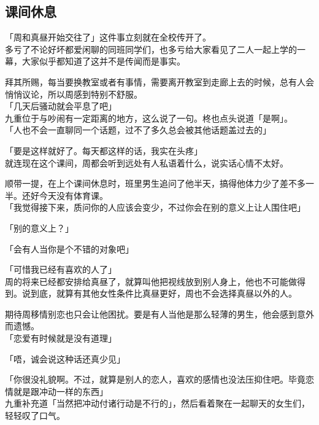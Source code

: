 \subsection{课间休息}

「周和真昼开始交往了」这件事立刻就在全校传开了。\\

多亏了不论好坏都爱闲聊的同班同学们，也多亏给大家看见了二人一起上学的一幕，大家似乎都知道了这并不是传闻而是事实。

拜其所赐，每当要换教室或者有事情，需要离开教室到走廊上去的时候，总有人会悄悄议论，所以周感到特别不舒服。\\

「几天后骚动就会平息了吧」\\

九重位于与吵闹有一定距离的地方，这么说了一句。柊也点头说道「是啊」。\\

「人也不会一直聊同一个话题，过不了多久总会被其他话题盖过去的」

「要是这样就好了。每天都这样的话，我实在头疼」\\

就连现在这个课间，周都会听到远处有人私语着什么，说实话心情不太好。

顺带一提，在上个课间休息时，班里男生追问了他半天，搞得他体力少了差不多一半。还好今天没有体育课。\\

「我觉得接下来，质问你的人应该会变少，不过你会在别的意义上让人围住吧」

「别的意义上？」

「会有人当你是个不错的对象吧」

「可惜我已经有喜欢的人了」\\

周的将来已经都安排给真昼了，就算叫他把视线放到别人身上，他也不可能做得到。说到底，就算有其他女性条件比真昼更好，周也不会选择真昼以外的人。

期待周移情别恋也只会让他困扰。要是有人当他是那么轻薄的男生，他会感到意外而遗憾。\\

「恋爱有时候就是没有道理」

「唔，诚会说这种话还真少见」

「你很没礼貌啊。不过，就算是别人的恋人，喜欢的感情也没法压抑住吧。毕竟恋情就是跟冲动一样的东西」\\

九重补充道「当然把冲动付诸行动是不行的」，然后看着聚在一起聊天的女生们，轻轻叹了口气。\\

